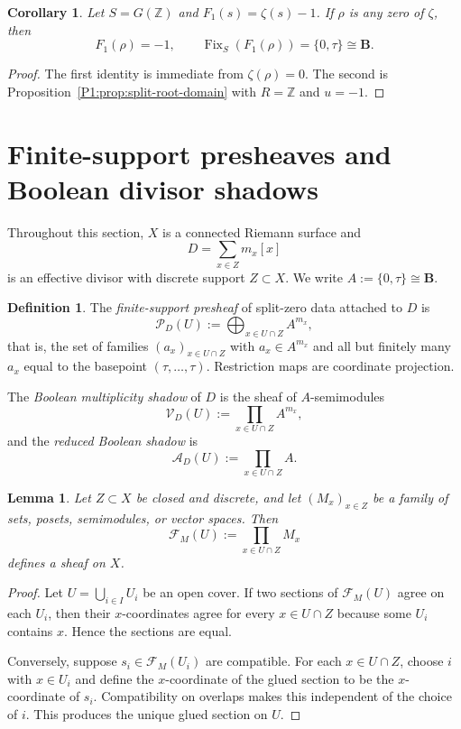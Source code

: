 \documentclass[11pt,a4paper]{article}
\numberwithin{equation}{section}
\newtheorem{lemma}[theorem]{Lemma}
\newtheorem{corollary}[theorem]{Corollary}
\theoremstyle{definition}
\newtheorem{definition}[theorem]{Definition}
\theoremstyle{remark}
\DeclareMathOperator{\Fix}{Fix}
\newcommand{\ZZ}{\mathbb Z}
\newcommand{\BB}{\mathbf B}
\newcommand{\cP}{\mathcal P}
\newcommand{\cV}{\mathcal V}
\newcommand{\cA}{\mathcal A}
\newcommand{\taup}{\tau}
\begin{document}
\begin{corollary}\label{P1:cor:zeta-pointwise}
Let $S=G(\ZZ)$ and $F_1(s)=\zeta(s)-1$.  If $\rho$ is any zero of $\zeta$, then
\[
F_1(\rho)=-1,
\qquad
\Fix_S(F_1(\rho))=\{0,\taup\}\cong\BB.
\]
\end{corollary}

\begin{proof}
The first identity is immediate from $\zeta(\rho)=0$.  The second is Proposition~\ref{P1:prop:split-root-domain} with $R=\ZZ$ and $u=-1$.
\end{proof}

\section{Finite-support presheaves and Boolean divisor shadows}

Throughout this section, $X$ is a connected Riemann surface and
\[
D=\sum_{x\in Z}m_x[x]
\]
is an effective divisor with discrete support $Z\subset X$.  We write $A:=\{0,\taup\}\cong\BB$.

\begin{definition}
The \emph{finite-support presheaf} of split-zero data attached to $D$ is
\[
\cP_D(U):=\bigoplus_{x\in U\cap Z}A^{m_x},
\]
that is, the set of families $(a_x)_{x\in U\cap Z}$ with $a_x\in A^{m_x}$ and all but finitely many $a_x$ equal to the basepoint $(\taup,\dots,\taup)$.  Restriction maps are coordinate projection.

The \emph{Boolean multiplicity shadow} of $D$ is the sheaf of $A$-semimodules
\[
\cV_D(U):=\prod_{x\in U\cap Z}A^{m_x},
\]
and the \emph{reduced Boolean shadow} is
\[
\cA_D(U):=\prod_{x\in U\cap Z}A.
\]
\end{definition}

\begin{lemma}\label{P1:lem:product-sheaf}
Let $Z\subset X$ be closed and discrete, and let $(M_x)_{x\in Z}$ be a family of sets, posets, semimodules, or vector spaces.  Then
\[
\mathcal F_M(U):=\prod_{x\in U\cap Z}M_x
\]
defines a sheaf on $X$.
\end{lemma}

\begin{proof}
Let $U=\bigcup_{i\in I}U_i$ be an open cover.  If two sections of $\mathcal F_M(U)$ agree on each $U_i$, then their $x$-coordinates agree for every $x\in U\cap Z$ because some $U_i$ contains $x$.  Hence the sections are equal.

Conversely, suppose $s_i\in\mathcal F_M(U_i)$ are compatible.  For each $x\in U\cap Z$, choose $i$ with $x\in U_i$ and define the $x$-coordinate of the glued section to be the $x$-coordinate of $s_i$.  Compatibility on overlaps makes this independent of the choice of $i$.  This produces the unique glued section on $U$.
\end{proof}
\end{document}
